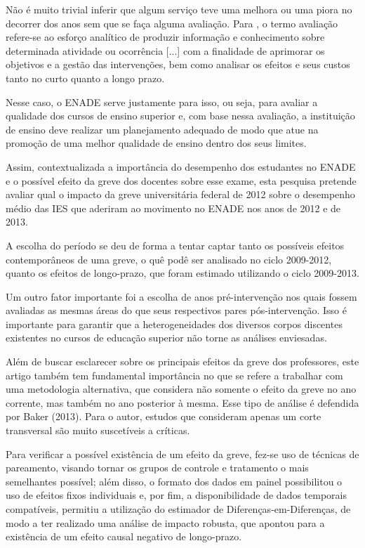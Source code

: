 Não é muito trivial inferir que algum serviço teve uma melhora ou uma piora no decorrer dos anos sem que se faça alguma avaliação. Para , o termo avaliação refere-se ao esforço analítico de produzir informação e conhecimento sobre determinada atividade ou ocorrência [...] com a finalidade de aprimorar os objetivos e a gestão das intervenções, bem como analisar os efeitos e seus custos tanto no curto quanto a longo prazo.

Nesse caso, o ENADE serve justamente para isso, ou seja, para avaliar a qualidade dos cursos de ensino superior e, com base nessa avaliação, a instituição de ensino deve realizar um planejamento adequado de modo que atue na promoção de uma melhor qualidade de ensino dentro dos seus limites.

Assim, contextualizada a importância do desempenho dos estudantes no ENADE e o possível efeito da greve dos docentes sobre esse exame, esta pesquisa pretende avaliar qual o impacto da greve universitária federal de 2012 sobre o desempenho médio das IES que aderiram ao movimento no ENADE nos anos de 2012 e de 2013.

A escolha do período se deu de forma a tentar captar tanto os possíveis efeitos contemporâneos de uma greve, o quê podê ser analisado no ciclo 2009-2012, quanto os efeitos de longo-prazo, que foram estimado utilizando o ciclo 2009-2013.

Um outro fator importante foi a escolha de anos pré-intervenção nos quais fossem avaliadas as mesmas áreas do que seus respectivos pares pós-intervenção. Isso é importante para garantir que a heterogeneidades dos diversos corpos discentes existentes no cursos de educação superior não torne as análises enviesadas.

Além de buscar esclarecer sobre os principais efeitos da greve dos professores, este artigo também tem fundamental importância no que se refere a trabalhar com uma metodologia alternativa, que considera não somente o efeito da greve no ano corrente, mas também no ano posterior à mesma. Esse tipo de análise é defendida por Baker (2013). Para o autor, estudos que consideram apenas um corte transversal são muito suscetíveis a críticas.

Para verificar a possível existência de um efeito da greve, fez-se uso de técnicas de pareamento, visando tornar os grupos de controle e tratamento o mais semelhantes possível; além disso, o formato dos dados em painel possibilitou o uso de efeitos fixos individuais e, por fim, a disponibilidade de dados temporais compatíveis, permitiu a utilização do estimador de Diferenças-em-Diferenças, de modo a ter realizado uma análise de impacto robusta, que apontou para a existência de um efeito causal negativo de longo-prazo.

